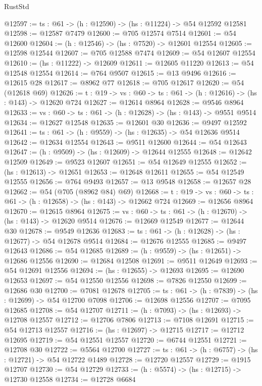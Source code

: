 \begin{lexlean}{RustStd}
\begin{coremodule}
@12597 := {ts : @61} -> (h : @12590) -> (hs : @11224) -> @54 @12592 @12581
@12598 := @12587 @7479
@12600 := @705 @12574 @7514
@12601 := @54 @12600
@12604 := (h : @12546) -> (hs : @7520) -> @12601 @12554
@12605 := @12598 @12544
@12607 := @705 @12588 @7474
@12609 := @54 @12607 @12554
@12610 := (hs : @11222) -> @12609
@12611 := @12605 @11220
@12613 := @54 @12548 @12554
@12614 := @764 @9507
@12615 := @13 @9496
@12616 := @12615 @28
@12617 := @8962 @77
@12618 := @705 @12617
@12620 := @54 (@12618 @69)
@12626 := {t : @19} -> {vs : @60} -> {ts : @61} -> (h : @12616) -> (hs : @143) -> @12620 @724
@12627 := @12614 @8964
@12628 := @9546 @8964
@12633 := {vs : @60} -> {ts : @61} -> (h : @12628) -> (hs : @143) -> @9551 @9514
@12634 := @12627 @12548
@12635 := @12601 @30
@12636 := @9497 @12592
@12641 := {ts : @61} -> (h : @9559) -> (hs : @12635) -> @54 @12636 @9514
@12642 := @12634 @12554
@12643 := @9511 @12600
@12644 := @54 @12643
@12647 := (h : @9509) -> (hs : @12609) -> @12644 @12555
@12648 := @12642 @12509
@12649 := @9523 @12607
@12651 := @54 @12649 @12555
@12652 := (hs : @12613) -> @12651
@12653 := @12648 @12611
@12655 := @54 @12549 @12555
@12656 := @764 @9493
@12657 := @13 @9548
@12658 := @12657 @28
@12662 := @54 (@705 (@8962 @84) @69)
@12668 := {t : @19} -> {vs : @60} -> {ts : @61} -> (h : @12658) -> (hs : @143) -> @12662 @724
@12669 := @12656 @8964
@12670 := @12615 @8964
@12675 := {vs : @60} -> {ts : @61} -> (h : @12670) -> (hs : @143) -> @12620 @9514
@12676 := @12669 @12549
@12677 := @12644 @30
@12678 := @9549 @12636
@12683 := {ts : @61} -> (h : @12628) -> (hs : @12677) -> @54 @12678 @9514
@12684 := @12676 @12555
@12685 := @9497 @12643
@12686 := @54 @12685
@12689 := (h : @9559) -> (hs : @12651) -> @12686 @12556
@12690 := @12684 @12508
@12691 := @9511 @12649
@12693 := @54 @12691 @12556
@12694 := (hs : @12655) -> @12693
@12695 := @12690 @12653
@12697 := @54 @12550 @12556
@12698 := @7826 @12550
@12699 := @12686 @30
@12700 := @7081 @12678
@12705 := {ts : @61} -> (h : @7839) -> (hs : @12699) -> @54 @12700 @7098
@12706 := @12698 @12556
@12707 := @7095 @12685
@12708 := @54 @12707
@12711 := (h : @7093) -> (hs : @12693) -> @12708 @12557
@12712 := @12706 @7806
@12713 := @7108 @12691
@12715 := @54 @12713 @12557
@12716 := (hs : @12697) -> @12715
@12717 := @12712 @12695
@12719 := @54 @12551 @12557
@12720 := @6744 @12551
@12721 := @12708 @30
@12722 := @5564 @12700
@12727 := {ts : @61} -> (h : @6757) -> (hs : @12721) -> @54 @12722 @1489
@12728 := @12720 @12557
@12729 := @1915 @12707
@12730 := @54 @12729
@12733 := (h : @5574) -> (hs : @12715) -> @12730 @12558
@12734 := @12728 @6684

\end{coremodule}
\end{lexlean}
